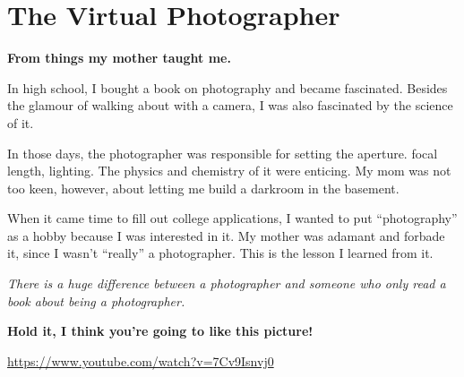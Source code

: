 \section{The Virtual Photographer}

\textbf{From things my mother taught me.}

In high school, I bought a book on photography and became fascinated. Besides the glamour of walking about with a camera, I was also fascinated by the science of it.

In those days, the photographer was responsible for setting the aperture. focal length, lighting. The physics and chemistry of it were enticing. My mom was not too keen, however, about letting me build a darkroom in the basement.

When it came time to fill out college applications, I wanted to put ``photography'' as a hobby because I was interested in it. My mother was adamant and forbade it, since I wasn't ``really'' a photographer. This is the lesson I learned from it.

\emph{There is a huge difference between a photographer and someone who only read a book about being a photographer.}

\textbf{Hold it, I think you're going to like this picture!}

\url{https://www.youtube.com/watch?v=7Cv9Isnvj0}



